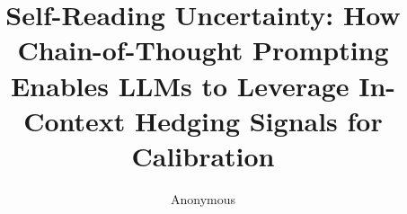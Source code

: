 \documentclass[letterpaper]{article}
\title{Self-Reading Uncertainty: How Chain-of-Thought Prompting Enables LLMs to Leverage In-Context Hedging Signals for Calibration}
\author{Anonymous}
\date{}
\begin{document}
\maketitle

\begin{abstract}

\end{abstract}











\end{document}
